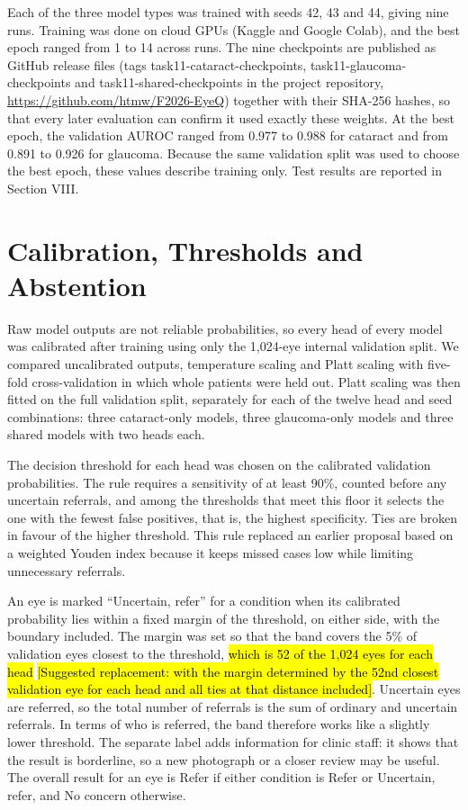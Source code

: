 \documentclass[conference,a4paper]{IEEEtran}
\newcommand{\proposedreplacement}[1]{{\sethlcolor{reviewred}\hl{#1}}}
\newcommand{\suggestedwording}[1]{{\sethlcolor{reviewgreen}\hl{[Suggested replacement: #1]}}}
\begin{document}
Each of the three model types was trained with seeds 42, 43 and 44, giving nine runs. Training was
done on cloud GPUs (Kaggle and Google Colab), and the best epoch ranged from 1 to 14 across runs.
The nine checkpoints are published as GitHub release files (tags task11-cataract-checkpoints,
task11-glaucoma-checkpoints and task11-shared-checkpoints in the project repository,
\url{https://github.com/htmw/F2026-EyeQ}) together with their SHA-256 hashes, so that every later
evaluation can confirm it used exactly these weights. At the best epoch, the validation AUROC ranged
from 0.977 to 0.988 for cataract and from 0.891 to 0.926 for glaucoma. Because the same validation
split was used to choose the best epoch, these values describe training only. Test results are
reported in Section VIII.

\section{Calibration, Thresholds and Abstention}

Raw model outputs are not reliable probabilities, so every head of every model was calibrated after
training using only the 1,024-eye internal validation split. We compared uncalibrated outputs,
temperature scaling \cite{ref20} and Platt scaling \cite{ref28} with five-fold cross-validation in
which whole patients were held out. Platt scaling was then fitted on the full validation split,
separately for each of the twelve head and seed combinations: three cataract-only models, three
glaucoma-only models and three shared models with two heads each.

The decision threshold for each head was chosen on the calibrated validation probabilities. The rule
requires a sensitivity of at least 90\%, counted before any uncertain referrals, and among the
thresholds that meet this floor it selects the one with the fewest false positives, that is, the
highest specificity. Ties are broken in favour of the higher threshold. This rule replaced an
earlier proposal based on a weighted Youden index because it keeps missed cases low while limiting
unnecessary referrals.

An eye is marked ``Uncertain, refer'' for a condition when its calibrated probability lies within a
fixed margin of the threshold, on either side, with the boundary included. The margin was set so
that the band covers the 5\% of validation eyes closest to the threshold, \proposedreplacement{which is 52 of the 1,024
eyes for each head} \suggestedwording{with the margin determined by the 52nd closest validation eye for each head and all ties at that distance included}. Uncertain eyes are referred, so the total number of referrals is the sum of
ordinary and uncertain referrals. In terms of who is referred, the band therefore works like a
slightly lower threshold. The separate label adds information for clinic staff: it shows that the
result is borderline, so a new photograph or a closer review may be useful. The overall result for
an eye is Refer if either condition is Refer or Uncertain, refer, and No concern otherwise.
\end{document}
